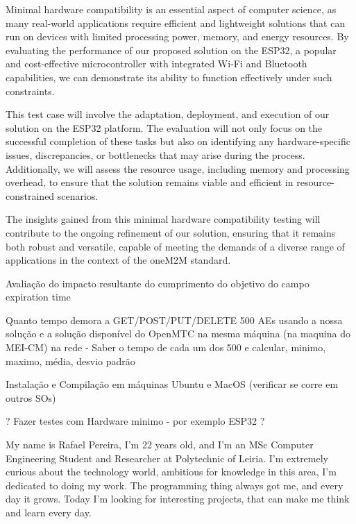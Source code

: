 \documentclass[a4paper,fleqn]{cas-dc}
\begin{document}
Minimal hardware compatibility is an essential aspect of computer science, as many real-world applications require efficient and lightweight solutions that can run on devices with limited processing power, memory, and energy resources. By evaluating the performance of our proposed solution on the ESP32, a popular and cost-effective microcontroller with integrated Wi-Fi and Bluetooth capabilities, we can demonstrate its ability to function effectively under such constraints.

This test case will involve the adaptation, deployment, and execution of our solution on the ESP32 platform. The evaluation will not only focus on the successful completion of these tasks but also on identifying any hardware-specific issues, discrepancies, or bottlenecks that may arise during the process. Additionally, we will assess the resource usage, including memory and processing overhead, to ensure that the solution remains viable and efficient in resource-constrained scenarios.

The insights gained from this minimal hardware compatibility testing will contribute to the ongoing refinement of our solution, ensuring that it remains both robust and versatile, capable of meeting the demands of a diverse range of applications in the context of the oneM2M standard.




Avaliação do impacto resultante do cumprimento do objetivo do campo expiration time

Quanto tempo demora a GET/POST/PUT/DELETE 500 AEs usando a nossa solução e a solução disponível do OpenMTC na mesma máquina (na maquina do MEI-CM) na rede - Saber o tempo de cada um dos 500 e calcular, minimo, maximo, média, desvio padrão

Instalação e Compilação em máquinas Ubuntu e MacOS (verificar se corre em outros SOs)

? Fazer testes com Hardware minimo - por exemplo ESP32 ?

\printcredits

%
%




My name is Rafael Pereira, I'm 22 years old, and I'm an MSc Computer Engineering Student and Researcher at Polytechnic of Leiria. I'm extremely curious about the technology world, ambitious for knowledge in this area, I'm dedicated to doing my work. The programming thing always got me, and every day it grows. Today I'm looking for interesting projects, that can make me think and learn every day.
\endbio
\end{document}
